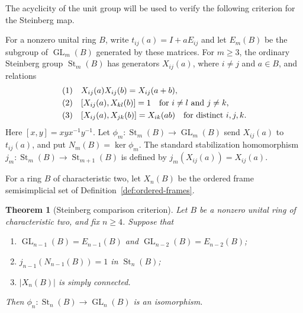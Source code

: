 \documentclass[11pt]{amsart}
\DeclareMathOperator{\GL}{GL}
\DeclareMathOperator{\St}{St}
\newtheorem{theorem}{Theorem}[section]
\theoremstyle{definition}
\theoremstyle{remark}
\numberwithin{equation}{section}
\newcommand{\eqrownum}[1][]{%
  \hbox{\refstepcounter{equation}%
    \if\relax\detokenize{#1}\relax\else\label{#1}\fi
    \normalfont(\theequation)}}
\begin{document}
The acyclicity of the unit group will be used to verify the following criterion for the Steinberg map.

For a nonzero unital ring $B$, write $t_{ij}(a)=I+aE_{ij}$ and let $E_m(B)$ be the subgroup of $\GL_m(B)$ generated by these matrices. For $m\geq3$, the ordinary Steinberg group $\St_m(B)$ has generators $X_{ij}(a)$, where $i\ne j$ and $a\in B$, and relations
$$
\begin{aligned}
\eqrownum &\quad X_{ij}(a)X_{ij}(b)=X_{ij}(a+b),\\
\eqrownum &\quad [X_{ij}(a),X_{kl}(b)]=1 \quad \text{for }i\ne l\text{ and }j\ne k,\\
\eqrownum &\quad [X_{ij}(a),X_{jk}(b)]=X_{ik}(ab) \quad \text{for distinct }i,j,k.
\end{aligned}
$$
Here $[x,y]=xyx^{-1}y^{-1}$. Let $\phi_m:\St_m(B)\to\GL_m(B)$ send $X_{ij}(a)$ to $t_{ij}(a)$, and put $N_m(B)=\ker\phi_m$. The standard stabilization homomorphism $j_m:\St_m(B)\to\St_{m+1}(B)$ is defined by $j_m(X_{ij}(a))=X_{ij}(a)$.

For a ring $B$ of characteristic two, let $X_n(B)$ be the ordered frame semisimplicial set of Definition~\ref{def:ordered-frames}.

\begin{theorem}[Steinberg comparison criterion]
\label{thm:raw-criterion}
Let $B$ be a nonzero unital ring of characteristic two, and fix $n\geq4$. Suppose that
\begin{enumerate}
\item $\GL_{n-1}(B)=E_{n-1}(B)$ and $\GL_{n-2}(B)=E_{n-2}(B)$;
\item $j_{n-1}(N_{n-1}(B))=1$ in $\St_n(B)$;
\item $|X_n(B)|$ is simply connected.
\end{enumerate}
Then $\phi_n:\St_n(B)\to\GL_n(B)$ is an isomorphism.
\end{theorem}
\end{document}
